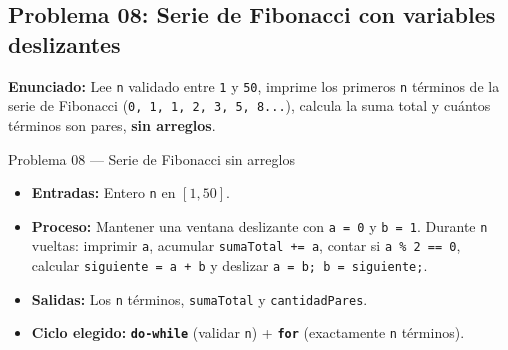 \documentclass[11pt,letterpaper]{article}
\begin{document}
\subsection{Problema 08: Serie de Fibonacci con variables deslizantes}

\textbf{Enunciado:} Lee \texttt{n} validado entre \texttt{1} y \texttt{50}, imprime los primeros \texttt{n} términos de la serie de Fibonacci (\texttt{0, 1, 1, 2, 3, 5, 8...}), calcula la suma total y cuántos términos son pares, \textbf{sin arreglos}.

\begin{analisis}{Problema 08 --- Serie de Fibonacci sin arreglos}
\begin{itemize}
  \item \textbf{Entradas:} Entero \texttt{n} en $[1, 50]$.
  \item \textbf{Proceso:} Mantener una ventana deslizante con \texttt{a = 0} y \texttt{b = 1}. Durante \texttt{n} vueltas: imprimir \texttt{a}, acumular \texttt{sumaTotal += a}, contar si \texttt{a \% 2 == 0}, calcular \texttt{siguiente = a + b} y deslizar \texttt{a = b; b = siguiente;}.
  \item \textbf{Salidas:} Los \texttt{n} términos, \texttt{sumaTotal} y \texttt{cantidadPares}.
  \item \textbf{Ciclo elegido:} \textbf{\texttt{do-while}} (validar \texttt{n}) + \textbf{\texttt{for}} (exactamente \texttt{n} términos).
\end{itemize}
\end{analisis}




\end{document}
